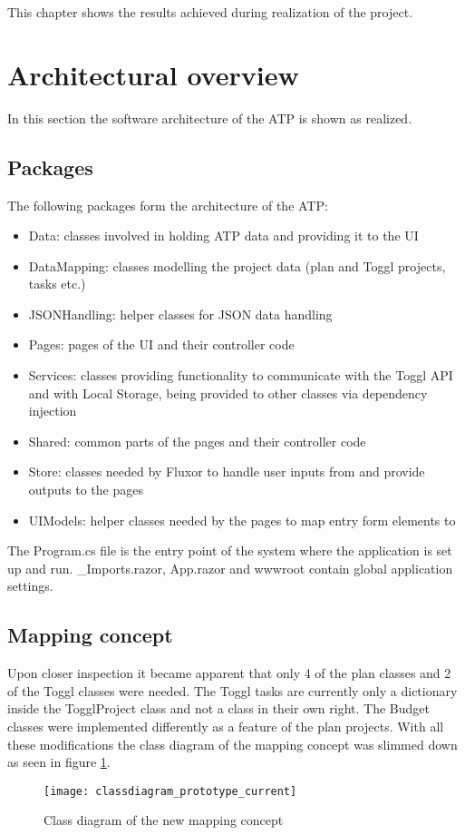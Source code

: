 
This chapter shows the results achieved during realization of the project.

\section{Architectural overview} \label{Architecture}
In this section the software architecture of the ATP is shown as realized.

\subsection{Packages}
The following packages form the architecture of the ATP:
\begin{itemize}
	\item Data: classes involved in holding ATP data and providing it to the UI
	\item DataMapping: classes modelling the project data (plan and Toggl projects, tasks etc.)
	\item JSONHandling: helper classes for JSON data handling
	\item Pages: pages of the UI and their controller code
	\item Services: classes providing functionality to communicate with the Toggl API and with Local Storage, being provided to other classes via dependency injection
	\item Shared: common parts of the pages and their controller code
	\item Store: classes needed by Fluxor to handle user inputs from and provide outputs to the pages
	\item UIModels: helper classes needed by the pages to map entry form elements to
\end{itemize}
The Program.cs file is the entry point of the system where the application is set up and run. _Imports.razor, App.razor and wwwroot contain global application settings.

\subsection{Mapping concept}
Upon closer inspection it became apparent that only 4 of the plan classes and 2 of the Toggl classes were needed. The Toggl tasks are currently only a dictionary inside the TogglProject class and not a class in their own right. The Budget classes were implemented differently as a feature of the plan projects. With all these modifications the class diagram of the mapping concept was slimmed down as seen in figure \ref{classdiagram_prototype_current}.
\begin{figure}[H]
	\centering
	\texttt{[image: classdiagram\_prototype\_current]}
	\caption{Class diagram of the new mapping concept}
	\label{classdiagram_prototype_current}
\end{figure}

